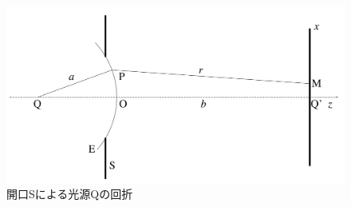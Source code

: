 \begin{figure}[htbp]\centering
	\includegraphics[width=\linewidth]{src/figures/principle/single_hole.png}
	\caption{開口Sによる光源Qの回折}
	\label{fig:single_hole_interference}
\end{figure}
